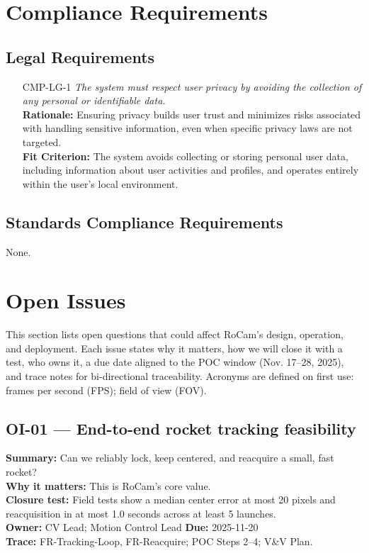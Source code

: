 \documentclass[12pt]{article}
\begin{document}
\section{Compliance Requirements}
\subsection{Legal Requirements}
\begin{itemize}[leftmargin=*]
  \item[CMP-LG-1] \emph{The system must respect user privacy by avoiding the collection
          of any personal or identifiable data.}\\ \textbf{Rationale:} Ensuring privacy
        builds user trust and minimizes risks associated with handling sensitive
        information, even when specific privacy laws are not targeted.\\ \textbf{Fit
          Criterion:} The system avoids collecting or storing personal user data,
        including information about user activities and profiles, and operates entirely
        within the user's local environment.
\end{itemize}

\subsection{Standards Compliance Requirements}

None.

\section{Open Issues}
\label{sec:open-issues}

This section lists open questions that could affect RoCam’s design, operation, and deployment. Each issue states why it matters, how we will close it with a test, who owns it, a due date aligned to the POC window (Nov. 17–28, 2025), and trace notes for bi-directional traceability. Acronyms are defined on first use: frames per second (FPS); field of view (FOV).

\subsection*{OI-01 — End-to-end rocket tracking feasibility}
\textbf{Summary:} Can we reliably lock, keep centered, and reacquire a small, fast rocket?\\
\textbf{Why it matters:} This is RoCam’s core value.\\
\textbf{Closure test:} Field tests show a median center error at most 20 pixels and reacquisition in at most 1.0 seconds across at least 5 launches.\\
\textbf{Owner:} CV Lead; Motion Control Lead \quad \textbf{Due:} 2025-11-20\\
\textbf{Trace:} FR-Tracking-Loop, FR-Reacquire; POC Steps 2–4; V\&V Plan.
\end{document}
